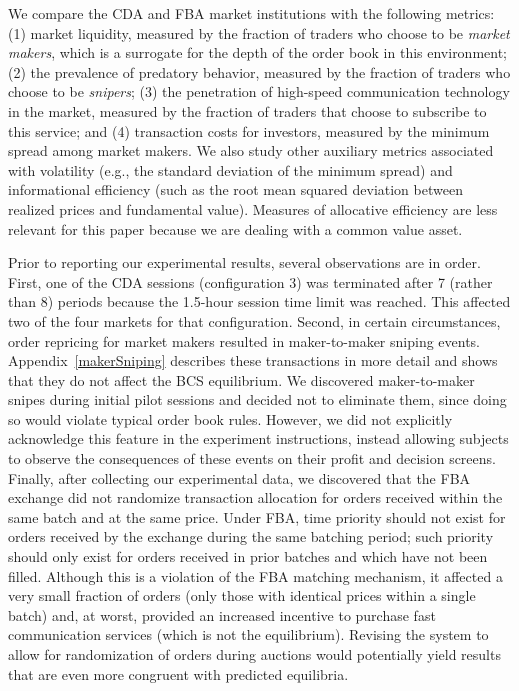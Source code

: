 \documentclass[12pt]{article}
\begin{document}
We compare the CDA and FBA market institutions with the following metrics: (1) market liquidity, measured by the fraction of traders who choose to be \textit{market makers}, which is a surrogate for the depth of the order book in this environment; (2) the prevalence of predatory behavior, measured by the fraction of traders who choose to be \textit{snipers}; (3) the penetration of high-speed communication technology in the market, measured by the fraction of traders that choose to subscribe to this service; and (4) transaction costs for investors, measured by the minimum spread among market makers. We also study other auxiliary metrics associated with volatility (e.g.,  the standard deviation of the minimum spread) and informational efficiency (such as the root mean squared deviation between realized prices and fundamental value). Measures of allocative efficiency are less relevant for this paper because we are dealing with a common value asset. 

Prior to reporting our experimental results, several observations are in order. First, one of the CDA sessions (configuration 3) was terminated after 7 (rather than 8) periods because the 1.5-hour session time limit was reached. This affected two of the four markets for that configuration. Second, in certain circumstances, order repricing for market makers resulted in maker-to-maker sniping events. Appendix~\ref{makerSniping} describes these transactions in more detail and shows that they do not affect the BCS equilibrium. We discovered maker-to-maker snipes during initial pilot sessions and decided not to eliminate them, since doing so would violate typical order book rules. However, we did not explicitly acknowledge this feature in the experiment instructions, instead allowing subjects to observe the consequences of these events on their profit and decision screens. Finally, after collecting our experimental data, we discovered that the FBA exchange did not randomize transaction allocation for orders received within the same batch and at the same price. Under FBA, time priority should not exist for orders received by the exchange during the same batching period; such priority should only exist for orders received in prior batches and which have not been filled. 
Although this is a violation of the FBA matching mechanism, it affected a very small fraction of orders (only those with identical prices within a single batch) and, at worst, provided an increased incentive to purchase fast communication services (which is not the equilibrium). Revising the system to allow for randomization of orders during auctions would potentially yield results that are even more congruent with predicted equilibria.
\end{document}
